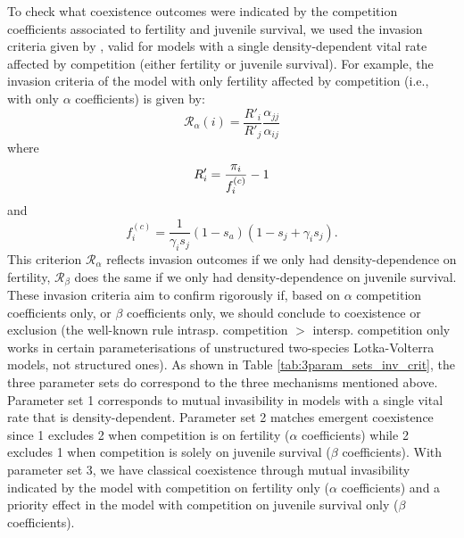 \documentclass{article}
\begin{document}
To check what coexistence outcomes were indicated by the competition coefficients associated to fertility and juvenile survival, we used the invasion criteria given by \citet{fujiwara2011coexistence}, valid for models with a single density-dependent vital rate affected by competition (either fertility or juvenile survival). For example, the invasion criteria of the model with only fertility affected by competition (i.e., with only $\alpha$ coefficients) is given by:
\begin{equation}
\mathcal{R}_\alpha(i) = \frac{R'_i}{R'_j} \frac{\alpha_{jj}}{\alpha_{ij}} 
\end{equation}
where 
\begin{equation}
    R'_i = \frac{\pi_{i}}{f_i^{(c)}} - 1\\
\end{equation}
and
\begin{equation}
    f^{(c)}_i = \frac{1}{\gamma_i s_j}(1 - s_a) \left(1- s_j+ \gamma_i s_j\right).
\end{equation}
This criterion $\mathcal{R}_{\alpha}$ reflects invasion outcomes if we only had density-dependence on fertility,  $\mathcal{R}_{\beta}$ does the same if we only had density-dependence on juvenile survival.
These invasion criteria aim to confirm rigorously if, based on $\alpha$ competition coefficients only, or $\beta$ coefficients only, we should conclude to coexistence or exclusion (the well-known rule intrasp. competition $>$ intersp. competition only works in certain parameterisations of unstructured two-species Lotka-Volterra models, not structured ones). As shown in Table \ref{tab:3param_sets_inv_crit}, the three parameter sets do correspond to the three mechanisms mentioned above. Parameter set 1 corresponds to mutual invasibility in models with a single vital rate that is density-dependent. Parameter set 2 matches emergent coexistence since 1 excludes 2 when competition is on fertility ($\alpha$ coefficients) while 2 excludes 1 when competition is solely on juvenile survival ($\beta$ coefficients). With parameter set 3, we have classical coexistence through mutual invasibility indicated by the model with competition on fertility only ($\alpha$ coefficients) and a priority effect in the model with competition on juvenile survival only ($\beta$ coefficients). 
\end{document}
